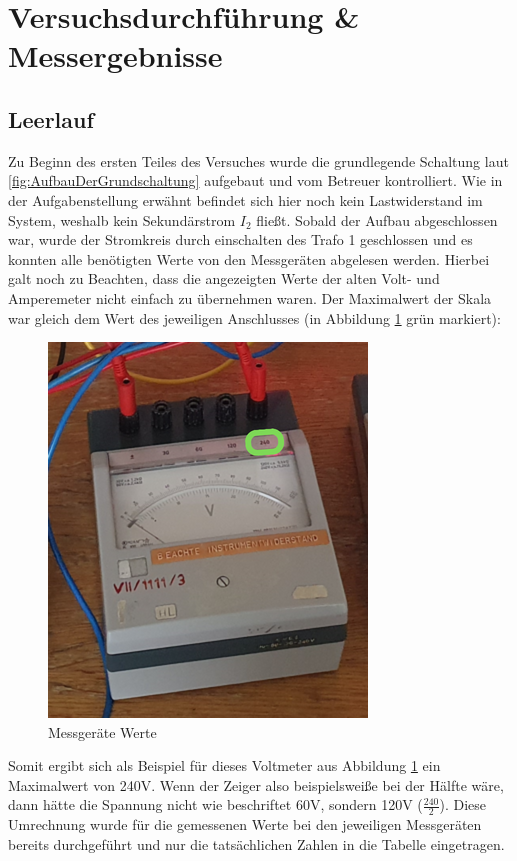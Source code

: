 \documentclass[12pt,a4paper,twoside]{article}
\begin{document}
\section{Versuchsdurchführung \& Messergebnisse} %

\subsection{Leerlauf}

Zu Beginn des ersten Teiles des Versuches wurde die grundlegende Schaltung laut \ref{fig:AufbauDerGrundschaltung} aufgebaut und vom Betreuer kontrolliert.
Wie in der Aufgabenstellung erwähnt befindet sich hier noch kein Lastwiderstand im System, weshalb kein Sekundärstrom $I_{2}$ fließt. Sobald der Aufbau abgeschlossen war, wurde der Stromkreis durch einschalten des Trafo 1 geschlossen und es konnten alle benötigten Werte von den Messgeräten abgelesen werden.
Hierbei galt noch zu Beachten, dass die angezeigten Werte der alten Volt- und Amperemeter nicht einfach zu übernehmen waren. Der Maximalwert der Skala war gleich dem Wert des jeweiligen Anschlusses (in Abbildung \ref{fig:MessgerätWerte} grün markiert):

\begin{figure}[H]
    \centering
    \includegraphics[width=0.4\linewidth, angle=0]{nudes/VoltmeterBeschriftung.png}
    \caption{Messgeräte Werte}
    \label{fig:MessgerätWerte}
\end{figure}

\noindent
Somit ergibt sich als Beispiel für dieses Voltmeter aus Abbildung \ref{fig:MessgerätWerte} ein Maximalwert von 240V. Wenn der Zeiger also beispielsweiße bei der Hälfte wäre, dann hätte die Spannung nicht wie beschriftet 60V, sondern 120V ($\frac{240}{2}$). Diese Umrechnung wurde für die gemessenen Werte bei den jeweiligen Messgeräten bereits durchgeführt und nur die tatsächlichen Zahlen in die Tabelle eingetragen.
\end{document}

